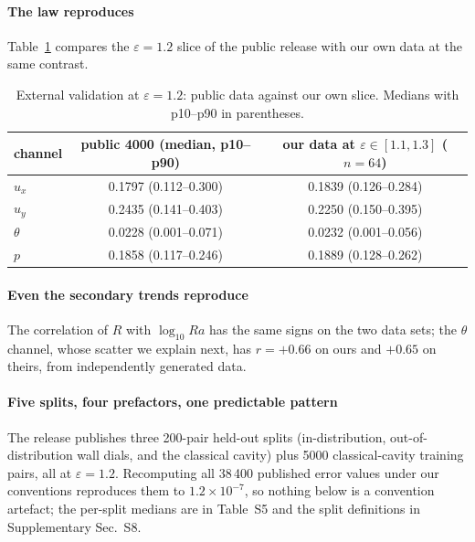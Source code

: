 \documentclass[preprint,11pt,a4paper,times,doubleblind]{elsarticle}
\begin{document}
\paragraph{The law reproduces} Table~\ref{tab:public} compares the $\varepsilon=1.2$ slice of the
public release with our own data at the same contrast.

\begin{table}[htbp]
\centering
\small
\caption{External validation at $\varepsilon=1.2$: public data against our own slice. Medians with
p10--p90 in parentheses.}
\label{tab:public}
\begin{tabular}{@{}lcc@{}}
\toprule
channel & public 4000 (median, p10--p90) & our data at $\varepsilon\in[1.1,1.3]$ ($n=64$)\\
\midrule
$u_x$ & 0.1797 (0.112--0.300) & 0.1839 (0.126--0.284)\\
$u_y$ & 0.2435 (0.141--0.403) & 0.2250 (0.150--0.395)\\
$\theta$ & 0.0228 (0.001--0.071) & 0.0232 (0.001--0.056)\\
$p$ & 0.1858 (0.117--0.246) & 0.1889 (0.128--0.262)\\
\bottomrule
\end{tabular}
\end{table}

\paragraph{Even the secondary trends reproduce} The correlation of $R$ with $\log_{10}Ra$
has the same signs on the two data sets; the $\theta$ channel, whose scatter we explain next, has
$r=+0.66$ on ours and $+0.65$ on theirs, from independently generated data.

\paragraph{Five splits, four prefactors, one predictable pattern} The release publishes three
200-pair held-out splits (in-distribution, out-of-distribution wall dials, and the classical
cavity) plus 5000 classical-cavity training pairs, all at $\varepsilon=1.2$. Recomputing all
38\,400 published error values under our conventions reproduces them to $1.2\times10^{-7}$, so
nothing below is a convention artefact; the per-split medians are in Table~S5 and the split
definitions in Supplementary Sec.~S8. 
\end{document}
